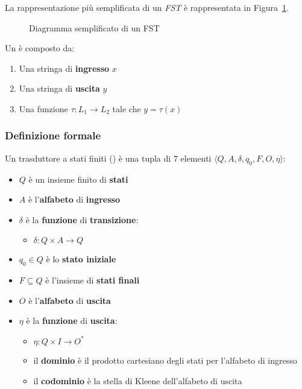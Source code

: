 \documentclass[italian, 10pt]{article}
\begin{document}
La rappresentazione più semplificata di un \textit{FST} è rappresentata in Figura~\ref{fig:diagramma-FST}.

\begin{figure}[htbp]
  \bigskip
  \centering
  \caption{Diagramma semplificato di un FST}
  \label{fig:diagramma-FST}
  \bigskip
\end{figure}

Un \FST è composto da:

\begin{enumerate}
  \item Una stringa di \textbf{ingresso} \(x\)
  \item Una stringa di \textbf{uscita} \(y\)
  \item Una funzione \(\tau: L_1 \rightarrow L_2 \) tale che \(y = \tau(x)\)
\end{enumerate}

\subsubsection{Definizione formale \FST}

Un trasduttore a stati finiti (\FST) è una tupla di \(7\) elementi \(\langle Q, A, \delta, q_0, F, O, \eta \rangle\):

\begin{itemize}
  \item \(Q\) è un insieme finito di \textbf{stati}
  \item \(A\) è l'\textbf{alfabeto} di \textbf{ingresso}
  \item \(\delta\) è la \textbf{funzione} di \textbf{transizione}:
        \begin{itemize}
          \item \(\delta: Q \times A \rightarrow Q\)
        \end{itemize}
  \item \(q_0 \in Q\) è lo \textbf{stato iniziale}
  \item \(F \subseteq Q\) è l'insieme di \textbf{stati finali}
  \item \(O\) è l'\textbf{alfabeto} di \textbf{uscita}
  \item \(\eta\) è la \textbf{funzione} di \textbf{uscita}:
        \begin{itemize}
          \item \(\eta: Q \times I \rightarrow O^\ast\)
          \item il \textbf{dominio} è il prodotto cartesiano degli stati per l'alfabeto di ingresso
          \item il \textbf{codominio} è la stella di Kleene dell'alfabeto di uscita
        \end{itemize}
\end{itemize}
\end{document}
